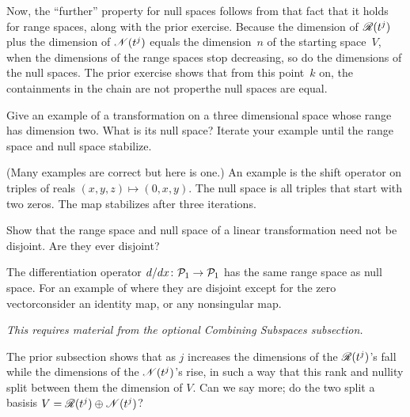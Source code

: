 \begin{exercises}
\begin{answer}
      Now, 
      the ``further'' property for null spaces follows from that fact
      that it holds for range spaces, along with the prior exercise.
      Because the dimension of $\mathscr{R}(t^j)$ plus the dimension of
      $\mathscr{N}(t^j)$ equals the dimension~$n$ of the starting space~$V$,
      when the dimensions of the range spaces stop decreasing, so do the
      dimensions of the null spaces.
      The prior exercise shows that from this point~$k$ on, 
      the containments in the chain are not proper\Dash the null spaces 
      are equal. 
    \end{answer}
  \recommended\item
    Give an example of a transformation on a three
    dimensional space whose range has dimension two.
    What is its null space?
    Iterate your example until the range space and null space stabilize.
    \begin{answer}
      (Many examples are correct but here is one.) 
      An example is the shift operator on triples of reals
      \( (x,y,z)\mapsto (0,x,y) \).
      The null space is all triples that start with two zeros.
      The map stabilizes after three iterations.
     \end{answer}
  \item 
      Show that the range space and null space of a linear transformation
      need not be disjoint.
      Are they ever disjoint?
      \begin{answer}
        The differentiation operator
        \( \mbox{$d/dx\colon \mathcal{P}_1\to \mathcal{P}_1$} \) has the same
        range space as null space.
        For an example of where they are disjoint\Dash
        except for the zero vector\Dash consider an identity map,
        or any nonsingular map. 
      \end{answer}
\end{exercises}

















\noindent\textit{This requires material from the 
    optional Combining Subspaces subsection.}

The prior subsection shows that as \( j \) increases
the dimensions of the $\mathscr{R}(t^j)$'s fall while
the dimensions of the $\mathscr{N}(t^j)$'s rise, 
in such a way that this rank and nullity split between them 
the dimension of $V$.
Can we say more;
do the two split a basis\Dash is
\( V=\mathscr{R}(t^j)\oplus\mathscr{N}(t^j) \)?

